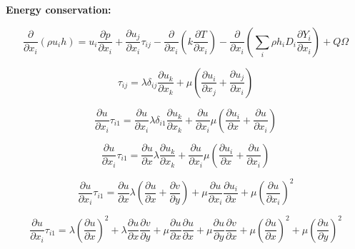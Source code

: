 \textbf{Energy conservation:}

\begin{equation} 
\frac{\partial}{\partial x_i}(\rho u_i h)=
u_i\frac{\partial p}{\partial x_i}+
\frac{\partial u_j}{\partial x_i}\tau_{ij}-
\frac{\partial}{\partial x_i}\left(k\frac{\partial T}{\partial x_i}\right)
-
\frac{\partial}{\partial x_i}
\left(
\sum_i\rho h_iD_i\frac{\partial Y_i}{\partial x_i}
\right)
+
Q\Omega
\end{equation} 

\begin{equation} 
\tau_{ij}=
\lambda \delta_{ij}\frac{\partial u_k}{\partial x_k}+
\mu\left(\frac{\partial u_i}{\partial x_j}
+\frac{\partial u_j}{\partial x_i}\right)
\end{equation} 

\begin{equation} 
\frac{\partial u}{\partial x_i}\tau_{i1}=
\frac{\partial u}{\partial x_i}\lambda \delta_{i1}\frac{\partial u_k}{\partial x_k}+
\frac{\partial u}{\partial x_i}\mu\left(\frac{\partial u_i}{\partial x}
+\frac{\partial u}{\partial x_i}\right)
\end{equation} 

\begin{equation} 
\frac{\partial u}{\partial x_i}\tau_{i1}=
\frac{\partial u}{\partial x}\lambda \frac{\partial u_k}{\partial x_k}+
\frac{\partial u}{\partial x_i}\mu\left(\frac{\partial u_i}{\partial x}
+\frac{\partial u}{\partial x_i}\right)
\end{equation} 

\begin{equation} 
\frac{\partial u}{\partial x_i}\tau_{i1}=
\frac{\partial u}{\partial x}
\lambda 
\left(
     \frac{\partial u}{\partial x}+
     \frac{\partial v}{\partial y}
\right)+
\mu\frac{\partial u}{\partial x_i}
\frac{\partial u_i}{\partial x}+
\mu\left(\frac{\partial u}{\partial x_i}\right)^2
\end{equation} 

\begin{equation} 
\frac{\partial u}{\partial x_i}\tau_{i1}=
\lambda 
\left(\frac{\partial u}{\partial x}\right)^2
+
\lambda 
\frac{\partial u }{\partial x}
\frac{\partial v }{\partial y}
+
\mu\frac{\partial u}{\partial x}
\frac{\partial u}{\partial x}+
\mu\frac{\partial u}{\partial y}
\frac{\partial v}{\partial x}+
\mu\left(\frac{\partial u}{\partial x}\right)^2
+
\mu\left(\frac{\partial u}{\partial y}\right)^2
\end{equation} 

